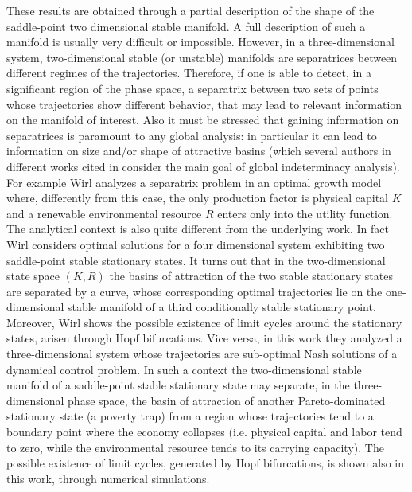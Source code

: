 These results are obtained through a partial description of the shape of the saddle-point two dimensional stable manifold. A full description of such a manifold is usually very difficult or impossible. However, in a three-dimensional system, two-dimensional stable (or unstable) manifolds are separatrices between different regimes of the trajectories. Therefore, if one is able to detect, in a significant region of the phase space, a separatrix between two sets of points whose trajectories show different behavior, that may lead to relevant information on the manifold of interest. Also it must be stressed that gaining information on separatrices is paramount to any global analysis: in particular it can lead to information on size and/or shape of attractive basins (which several authors in different works cited in \cite{antoci_poverty_2011} consider the main goal of global indeterminacy analysis).\\ 
For example Wirl \cite{wirl_sustainable_2004} analyzes a separatrix problem in an optimal growth model where, differently from this case, the only production factor is physical capital $K$ and a renewable environmental resource $R$ enters only into the utility function. The analytical context is also quite different from the underlying work. In fact Wirl considers optimal solutions for a four dimensional system exhibiting two saddle-point stable stationary states. It turns out that in the two-dimensional state space $(K,R)$ the basins of attraction of the two stable stationary states are separated by a curve, whose corresponding optimal trajectories lie on the one-dimensional stable manifold of a third conditionally stable stationary point. Moreover, Wirl shows the possible existence of limit cycles around the stationary states, arisen through Hopf bifurcations. Vice versa, in this work they analyzed a three-dimensional system whose trajectories are sub-optimal Nash solutions of a dynamical control problem. In such a context the two-dimensional stable manifold of a saddle-point stable stationary state may separate, in the three-dimensional phase space, the basin of attraction of another Pareto-dominated stationary state (a poverty trap) from a region whose trajectories tend to a boundary point where the economy collapses (i.e. physical capital and labor tend to zero, while the environmental resource tends to its carrying capacity). The possible existence of limit cycles, generated by Hopf bifurcations, is shown also in this work, through numerical simulations.

